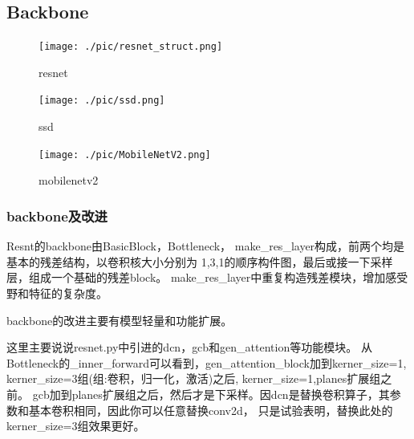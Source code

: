 \documentclass[UTF8]{ctexart}
\begin{document}
\newpage
\subsection{Backbone}
\label{backbone}

\begin{figure}[htbp]
	\centering
	\begin{minipage}[t]{0.48\textwidth}
	\centering
	\texttt{[image: ./pic/resnet\_struct.png]}
	\caption{resnet}
	\label{picresnet}
	\end{minipage}
	\begin{minipage}[t]{0.48\textwidth}
		\centering
		\texttt{[image: ./pic/ssd.png]}
		\caption{ssd}
		\label{picssd}
	\end{minipage}
\end{figure}

\begin{figure}[htbp]
	\centering
	\texttt{[image: ./pic/MobileNetV2.png]}
	\caption{mobilenetv2}
	\label{picmobilenet}
\end{figure}


\subsubsection{backbone及改进}

Resnt的backbone由BasicBlock，Bottleneck， make\_res\_layer构成，前两个均是基本的残差结构，以卷积核大小分别为
1,3,1的顺序构件图，最后或接一下采样层，组成一个基础的残差block。
make\_res\_layer中重复构造残差模块，增加感受野和特征的复杂度。

backbone的改进主要有模型轻量和功能扩展。

这里主要说说resnet.py中引进的dcn，gcb和gen\_attention等功能模块。
从Bottleneck的\_inner\_forward可以看到，gen\_attention\_block加到kerner\_size=1,
kerner\_size=3组(组:卷积，归一化，激活)之后,
kerner\_size=1,planes扩展组之前。
gcb加到planes扩展组之后，然后才是下采样。因dcn是替换卷积算子，其参数和基本卷积相同，因此你可以任意替换conv2d，
只是试验表明，替换此处的kerner\_size=3组效果更好。
\end{document}
